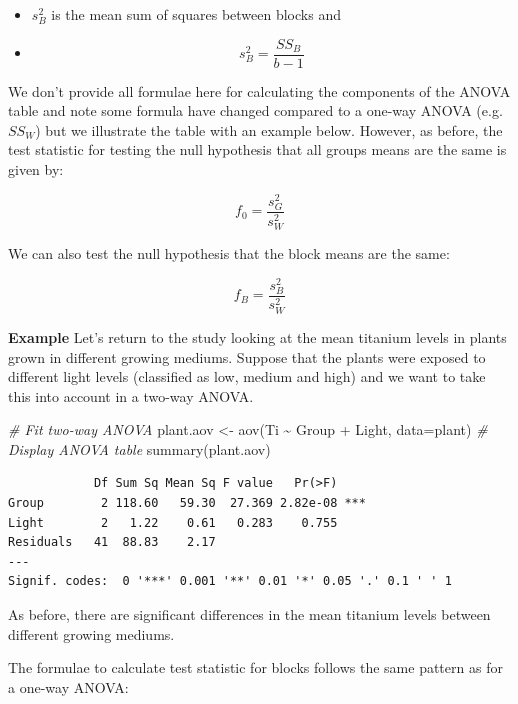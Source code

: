 \documentclass[
  oneside]{krantz}
\newenvironment{Shaded}{\begin{snugshade}}{\end{snugshade}}
\newcommand{\AttributeTok}[1]{\textcolor[rgb]{0.77,0.63,0.00}{#1}}
\newcommand{\CommentTok}[1]{\textcolor[rgb]{0.56,0.35,0.01}{\textit{#1}}}
\newcommand{\FunctionTok}[1]{\textcolor[rgb]{0.00,0.00,0.00}{#1}}
\newcommand{\NormalTok}[1]{#1}
\newcommand{\OtherTok}[1]{\textcolor[rgb]{0.56,0.35,0.01}{#1}}
\newcommand{\SpecialCharTok}[1]{\textcolor[rgb]{0.00,0.00,0.00}{#1}}
\begin{document}
\begin{itemize}
\item
  \(s_B^2\) is the mean sum of squares between blocks and
\item
  \[s_B^2 = \frac{SS_B}{b-1}\]
\end{itemize}

We don't provide all formulae here for calculating the components of the ANOVA table and note some formula have changed compared to a one-way ANOVA (e.g.~\(SS_W\)) but we illustrate the table with an example below. However, as before, the test statistic for testing the null hypothesis that all groups means are the same is given by:

\[f_0 = \frac{s_G^2}{s_W^2}\]

We can also test the null hypothesis that the block means are the same:

\[f_B = \frac{s_B^2}{s_W^2}\]

\textbf{Example} Let's return to the study looking at the mean titanium levels in plants grown in different growing mediums. Suppose that the plants were exposed to different light levels (classified as low, medium and high) and we want to take this into account in a two-way ANOVA.

\begin{Shaded}
\begin{Highlighting}[]
\CommentTok{\# Fit two{-}way ANOVA}
\NormalTok{plant.aov }\OtherTok{\textless{}{-}} \FunctionTok{aov}\NormalTok{(Ti }\SpecialCharTok{\textasciitilde{}}\NormalTok{ Group }\SpecialCharTok{+}\NormalTok{ Light, }\AttributeTok{data=}\NormalTok{plant)}
\CommentTok{\# Display ANOVA table}
\FunctionTok{summary}\NormalTok{(plant.aov)}
\end{Highlighting}
\end{Shaded}

\begin{verbatim}
            Df Sum Sq Mean Sq F value   Pr(>F)    
Group        2 118.60   59.30  27.369 2.82e-08 ***
Light        2   1.22    0.61   0.283    0.755    
Residuals   41  88.83    2.17                     
---
Signif. codes:  0 '***' 0.001 '**' 0.01 '*' 0.05 '.' 0.1 ' ' 1
\end{verbatim}

As before, there are significant differences in the mean titanium levels between different growing mediums.

The formulae to calculate test statistic for blocks follows the same pattern as for a one-way ANOVA:
\end{document}
